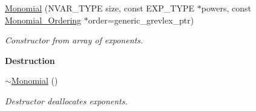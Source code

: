 \begin{Indent}
\begin{DoxyCompactItemize}
\hyperlink{group__polygroup_a85d91b1a13592c849394c26c5ad294d8}{Monomial} (N\+V\+A\+R\+\_\+\+T\+Y\+PE size, const E\+X\+P\+\_\+\+T\+Y\+PE $\ast$powers, const \hyperlink{group__orderinggroup_class_monomial___ordering}{Monomial\+\_\+\+Ordering} $\ast$order=generic\+\_\+grevlex\+\_\+ptr)
\begin{DoxyCompactList}\small\item\em Constructor from array of exponents. \end{DoxyCompactList}\end{DoxyCompactItemize}
\end{Indent}
\begin{Indent}\textbf{ Destruction}\par
\begin{DoxyCompactItemize}
\item 
\mbox{\label{group__polygroup_a7c56cfe0292638732d60169d960f877c}} 
\hyperlink{group__polygroup_a7c56cfe0292638732d60169d960f877c}{$\sim$\+Monomial} ()
\begin{DoxyCompactList}\small\item\em Destructor deallocates exponents. \end{DoxyCompactList}\end{DoxyCompactItemize}
\end{Indent}
